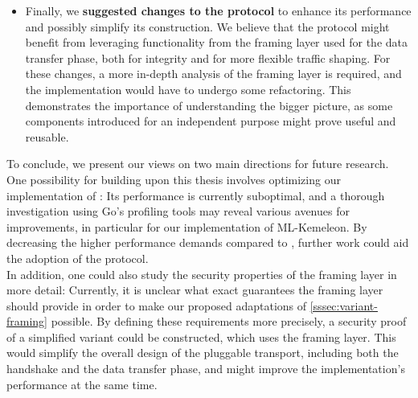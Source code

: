 \begin{itemize}
    \item Finally, we \textbf{suggested changes to the \drivel{} protocol} to enhance its performance and possibly simplify its construction. We believe that the protocol might benefit from leveraging functionality from the framing layer used for the data transfer phase, both for integrity and for more flexible traffic shaping. For these changes, a more in-depth analysis of the framing layer is required, and the implementation would have to undergo some refactoring. This demonstrates the importance of understanding the bigger picture, as some components introduced for an independent purpose might prove useful and reusable.
\end{itemize}

To conclude, we present our views on two main directions for future research.
One possibility for building upon this thesis involves optimizing our implementation of \drivel{}: Its performance is currently suboptimal, and a thorough investigation using Go's profiling tools may reveal various avenues for improvements, in particular for our implementation of ML-Kemeleon. By decreasing the higher performance demands compared to \obfsfour{}, further work could aid the adoption of the protocol. \\
In addition, one could also study the security properties of the framing layer in more detail: Currently, it is unclear what exact guarantees the framing layer should provide in order to make our proposed adaptations of \cref{sssec:variant-framing} possible. By defining these requirements more precisely, a security proof of a simplified \drivel{} variant could be constructed, which uses the framing layer. This would simplify the overall design of the pluggable transport, including both the handshake and the data transfer phase, and might improve the implementation's performance at the same time.
